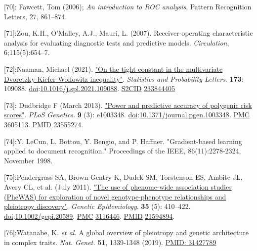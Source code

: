 \documentclass[
]{article}
\begin{document}
{[}70{]}: Fawcett, Tom (2006); \emph{An introduction to ROC analysis},
Pattern Recognition Letters, 27, 861--874.

{[}71{]}:Zou, K.H., O'Malley, A.J., Mauri, L. (2007). Receiver-operating
characteristic analysis for evaluating diagnostic tests and predictive
models. \emph{Circulation}, 6;115(5):654--7.

{[}72{]}:Naaman, Michael (2021).
\href{https://www.sciencedirect.com/science/article/pii/S016771522100050X}{"On
the tight constant in the multivariate Dvoretzky-Kiefer-Wolfowitz
inequality"}. \emph{Statistics and Probability Letters}. \textbf{173}:
109088.
\href{https://en.wikipedia.org/wiki/Doi_(identifier)}{doi}:\href{https://doi.org/10.1016\%2Fj.spl.2021.109088}{10.1016/j.spl.2021.109088}.
\href{https://en.wikipedia.org/wiki/S2CID_(identifier)}{S2CID}
\href{https://api.semanticscholar.org/CorpusID:233844405}{233844405}

{[}73{]}: Dudbridge F (March 2013).
\href{https://www.ncbi.nlm.nih.gov/pmc/articles/PMC3605113}{"Power and
predictive accuracy of polygenic risk scores"}. \emph{PLoS Genetics}.
\textbf{9} (3): e1003348.
\href{https://en.wikipedia.org/wiki/Doi_(identifier)}{doi}:\href{https://doi.org/10.1371\%2Fjournal.pgen.1003348}{10.1371/journal.pgen.1003348}.
\href{https://en.wikipedia.org/wiki/PMC_(identifier)}{PMC}
\href{https://www.ncbi.nlm.nih.gov/pmc/articles/PMC3605113}{3605113}.
\href{https://en.wikipedia.org/wiki/PMID_(identifier)}{PMID}
\href{https://pubmed.ncbi.nlm.nih.gov/23555274}{23555274}.

{[}74{]}:Y. LeCun, L. Bottou, Y. Bengio, and P. Haffner. "Gradient-based
learning applied to document recognition." Proceedings of the IEEE,
86(11):2278-2324, November 1998.

{[}75{]}:Pendergrass SA, Brown-Gentry K, Dudek SM, Torstenson ES, Ambite
JL, Avery CL, et al. (July 2011).
\href{https://www.ncbi.nlm.nih.gov/pmc/articles/PMC3116446}{"The use of
phenome-wide association studies (PheWAS) for exploration of novel
genotype-phenotype relationships and pleiotropy discovery"}.
\emph{Genetic Epidemiology}. \textbf{35} (5): 410--422.
\href{https://en.wikipedia.org/wiki/Doi_(identifier)}{doi}:\href{https://doi.org/10.1002\%2Fgepi.20589}{10.1002/gepi.20589}.
\href{https://en.wikipedia.org/wiki/PMC_(identifier)}{PMC}
\href{https://www.ncbi.nlm.nih.gov/pmc/articles/PMC3116446}{3116446}.
\href{https://en.wikipedia.org/wiki/PMID_(identifier)}{PMID}
\href{https://pubmed.ncbi.nlm.nih.gov/21594894}{21594894}.

{[}76{]}:Watanabe, K. \emph{et al.} A global overview of pleiotropy and
genetic architecture in complex traits. \emph{Nat. Genet.} \textbf{51},
1339-1348 (2019).
\href{https://www.ncbi.nlm.nih.gov/pubmed/31427789}{PMID: 31427789}
\end{document}
